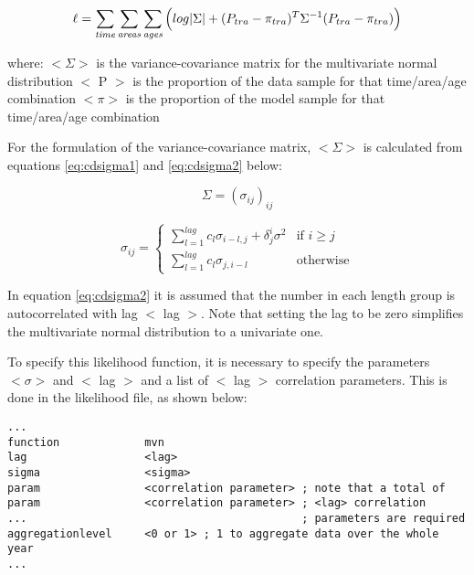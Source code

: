 \documentclass[10pt,twoside]{book}
\begin{document}
\begin{equation}\label{eq:catchdist5}
\ell = \sum_{\it time}\sum_{\it areas}\sum_{\it ages} \Big( log|\Sigma| + (P_{tra} - \pi_{tra})^T \Sigma^{-1}(P_{tra} - \pi_{tra}) \Big)
\end{equation}

where:\newline
$<\Sigma>$ is the variance-covariance matrix for the multivariate normal distribution\newline
$<$ P $>$ is the proportion of the data sample for that time/area/age combination\newline
$<\pi>$ is the proportion of the model sample for that time/area/age combination

\bigskip
For the formulation of the variance-covariance matrix, $<\Sigma>$ is calculated from equations \ref{eq:cdsigma1} and \ref{eq:cdsigma2} below:

\begin{equation}\label{eq:cdsigma1}
\Sigma = (\sigma_{ij})_{ij}
\end{equation}

\begin{equation}\label{eq:cdsigma2}
\sigma_{ij} =
\begin{cases}
\displaystyle \sum^{lag}_{l=1} c_l \sigma_{i-l,j} + \delta^i_{j} \sigma^2 & \textrm{if $i \geq j$} \\
\displaystyle \sum^{lag}_{l=1} c_l \sigma_{j,i-l} & \textrm{otherwise}
\end{cases}
\end{equation}

In equation \ref{eq:cdsigma2} it is assumed that the number in each length group is autocorrelated with lag $<$ lag $>$.  Note that setting the lag to be zero simplifies the multivariate normal distribution to a univariate one.

\bigskip
To specify this likelihood function, it is necessary to specify the parameters $<\sigma>$ and $<$ lag $>$ and a list of $<$ lag $>$ correlation parameters.  This is done in the likelihood file, as shown below:

{\small\begin{verbatim}
...
function             mvn
lag                  <lag>
sigma                <sigma>
param                <correlation parameter> ; note that a total of
param                <correlation parameter> ; <lag> correlation
...                                          ; parameters are required
aggregationlevel     <0 or 1> ; 1 to aggregate data over the whole year
...
\end{verbatim}}
\end{document}
